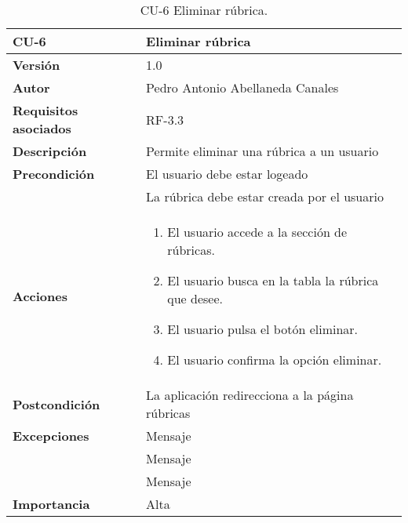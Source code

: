 \begin{table}[p]
	\centering
	\begin{tabularx}{\linewidth}{ p{} p{} }
		\toprule
		\textbf{CU-6}    & \textbf{Eliminar rúbrica} \\
		\midrule
		\textbf{Versión}              & 1.0    \\
		\textbf{Autor}                & Pedro Antonio Abellaneda Canales \\
		\textbf{Requisitos asociados} & RF-3.3 \\
		\textbf{Descripción}          & Permite eliminar una rúbrica a un usuario \\
		\textbf{Precondición}         & El usuario debe estar logeado \\& La rúbrica debe estar creada por el usuario \\
		\textbf{Acciones}             &
		\begin{enumerate}
			\def\labelenumi{\arabic{enumi}.}
			\tightlist
			\item El usuario accede a la sección de rúbricas.
            \item El usuario busca en la tabla la rúbrica que desee.
			\item El usuario pulsa el botón eliminar.
            \item El usuario confirma la opción eliminar.
		\end{enumerate} \\
		\textbf{Postcondición}        & La aplicación redirecciona a la página rúbricas \\ 
		\textbf{Excepciones}          & Mensaje \\ 
		                              & Mensaje \\ 
		                              & Mensaje \\
		\textbf{Importancia}          & Alta \\
		\bottomrule
	\end{tabularx}
	\caption{CU-6 Eliminar rúbrica.}
	\label{tab:CU-6}
\end{table}


